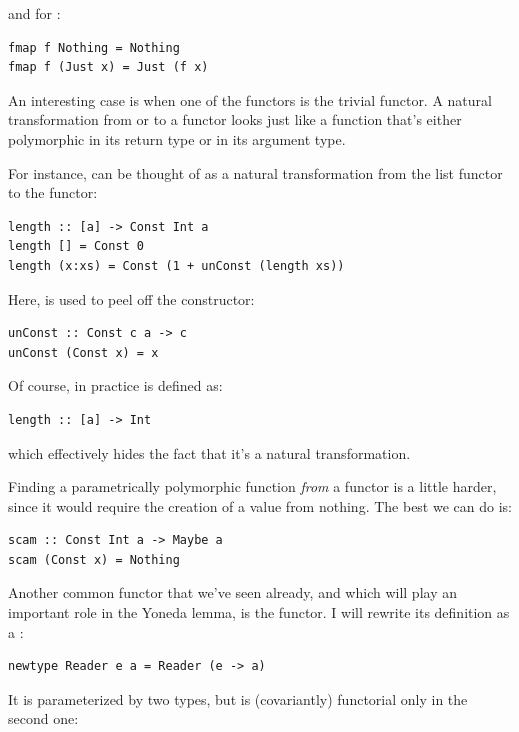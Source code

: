 and for :

\begin{verbatim}
fmap f Nothing = Nothing
fmap f (Just x) = Just (f x)
\end{verbatim}

An interesting case is when one of the functors is the trivial
 functor. A natural transformation from or to a
 functor looks just like a function that's either
polymorphic in its return type or in its argument type.

For instance,  can be thought of as a natural
transformation from the list functor to the  functor:

\begin{verbatim}
length :: [a] -> Const Int a
length [] = Const 0
length (x:xs) = Const (1 + unConst (length xs))
\end{verbatim}

Here,  is used to peel off the 
constructor:

\begin{verbatim}
unConst :: Const c a -> c
unConst (Const x) = x
\end{verbatim}

Of course, in practice  is defined as:

\begin{verbatim}
length :: [a] -> Int
\end{verbatim}

which effectively hides the fact that it's a natural transformation.

Finding a parametrically polymorphic function \emph{from} a
 functor is a little harder, since it would require the
creation of a value from nothing. The best we can do is:

\begin{verbatim}
scam :: Const Int a -> Maybe a
scam (Const x) = Nothing
\end{verbatim}

Another common functor that we've seen already, and which will play an
important role in the Yoneda lemma, is the  functor. I
will rewrite its definition as a :

\begin{verbatim}
newtype Reader e a = Reader (e -> a)
\end{verbatim}

It is parameterized by two types, but is (covariantly) functorial only
in the second one:

